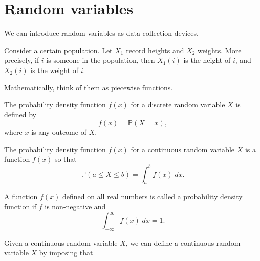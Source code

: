\documentclass[../main.tex]{subfiles}
\begin{document}
 \section{Random variables}

We can introduce random variables as data collection devices.

Consider a certain population. Let \(X_{1}\) record heights and \(X_{2}\) weights. More precisely, if \(i\) is someone in the population, then \(X_{1}(i)\) is the height of \(i\), and \(X_{2}(i)\) is the weight of \(i\).

Mathematically, think of them as piecewise functions.

\begin{definition}
  The probability density function \(f(x)\) for a discrete random variable \(X\) is defined by
  \[
    f(x) = \mathbb{P}(X = x),
  \]
  where \(x\) is any outcome of \(X\).
\end{definition}

\begin{definition}
  The probability density function \(f(x)\) for a continuous random variable \(X\) is a function \(f(x)\) so that
  \[
    \mathbb{P}(a \le X \le b) = \int_{a}^{b} f(x) \;dx.
  \]
\end{definition}

\begin{definition}
  A function \(f(x)\) defined on all real numbers is called a probability density function if \(f\) is non-negative and 
  \[
    \int_{-\infty}^{\infty} f(x) \;dx = 1.
  \]

  Given a continuous random variable \(X\), we can define a continuous random variable \(X\) by imposing that
  \[
    
  \]
\end{definition}
\end{document}
